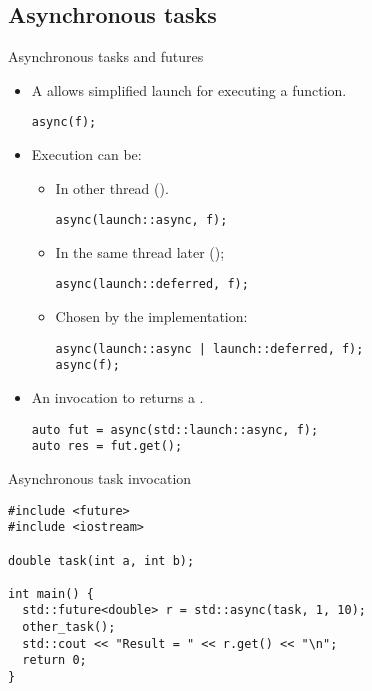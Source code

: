 \subsection{Asynchronous tasks}

\begin{frame}[t,fragile]{Asynchronous tasks and futures}
\begin{itemize}
  \item A  
        allows simplified launch for executing a function. 
\begin{lstlisting}
async(f);
\end{lstlisting}

  \item Execution can be:
    \begin{itemize}
      \item In other thread ().
\begin{lstlisting}
async(launch::async, f);
\end{lstlisting}

      \item In the same thread later ();
\begin{lstlisting}
async(launch::deferred, f);
\end{lstlisting}

      \item Chosen by the implementation:
\begin{lstlisting}
async(launch::async | launch::deferred, f);
async(f);
\end{lstlisting}

    \end{itemize}

  \item An invocation to  returns a .
\begin{lstlisting}
auto fut = async(std::launch::async, f);
auto res = fut.get();
\end{lstlisting}
\end{itemize}
\end{frame}

\begin{frame}[t,fragile]{Asynchronous task invocation}
\begin{lstlisting}
#include <future>
#include <iostream>

double task(int a, int b);

int main() {
  std::future<double> r = std::async(task, 1, 10);
  other_task();
  std::cout << "Result = " << r.get() << "\n";
  return 0;
}
\end{lstlisting}
\end{frame}
